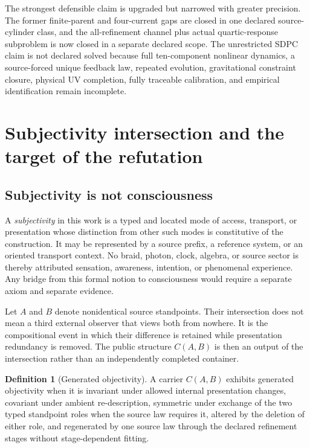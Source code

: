 \documentclass[11pt]{article}
\theoremstyle{definition}
\newtheorem{definition}[theorem]{Definition}
\theoremstyle{remark}
\begin{document}
The strongest defensible claim is upgraded but narrowed with greater precision. The former finite-parent and four-current gaps are closed in one declared source-cylinder class, and the all-refinement channel plus actual quartic-response subproblem is now closed in a separate declared scope. The unrestricted SDPC claim is not declared solved because full ten-component nonlinear dynamics, a source-forced unique feedback law, repeated evolution, gravitational constraint closure, physical UV completion, fully traceable calibration, and empirical identification remain incomplete.

\section{Subjectivity intersection and the target of the refutation}

\subsection{Subjectivity is not consciousness}

A \emph{subjectivity} in this work is a typed and located mode of access, transport, or presentation whose distinction from other such modes is constitutive of the construction. It may be represented by a source prefix, a reference system, or an oriented transport context. No braid, photon, clock, algebra, or source sector is thereby attributed sensation, awareness, intention, or phenomenal experience. Any bridge from this formal notion to consciousness would require a separate axiom and separate evidence.

Let $A$ and $B$ denote nonidentical source standpoints. Their intersection does not mean a third external observer that views both from nowhere. It is the compositional event in which their difference is retained while presentation redundancy is removed. The public structure $C(A,B)$ is then an output of the intersection rather than an independently completed container.

\begin{definition}[Generated objectivity]
A carrier $C(A,B)$ exhibits generated objectivity when it is invariant under allowed internal presentation changes, covariant under ambient re-description, symmetric under exchange of the two typed standpoint roles when the source law requires it, altered by the deletion of either role, and regenerated by one source law through the declared refinement stages without stage-dependent fitting.
\end{definition}
\end{document}

